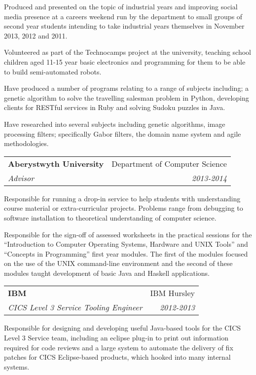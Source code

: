 \documentclass[letterpaper,11pt]{article}
\makeatletter
\newlength{\outerbordwidth}
\newcommand{\resheading}[1]{\vspace{8pt}
  \parbox{\textwidth}{\setlength{\FrameSep}{\outerbordwidth}
    \begin{shaded}
\setlength{\fboxsep}{0pt}\framebox[\textwidth][l]{\setlength{\fboxsep}{4pt}\fcolorbox{shadecolorB}{shadecolorB}{\textbf{\sffamily{\mbox{~}\makebox[6.762in][l]{\large #1} \vphantom{p\^{E}}}}}}
    \end{shaded}
  }\vspace{-5pt}
}
\newcommand{\ressubheading}[4]{
\begin{tabular*}{6.5in}{l@{\cftdotfill{\cftsecdotsep}\extracolsep{\fill}}r}
		\textbf{#1} & #2 \\
		\textit{#3} & \textit{#4} \\
\end{tabular*}\vspace{-6pt}}
\makeatother
\begin{document}
Produced and presented on the topic of industrial years and improving social
media presence at a careers weekend run by the department to small groups of
second year students intending to take industrial years themselves in November
2013, 2012 and 2011.

Volunteered as part of the Technocamps project at the university, teaching 
school children aged 11-15 year basic electronics and programming for them to 
be able to build semi-automated robots.

Have produced a number of programs relating to a range of subjects including; a
genetic algorithm to solve the travelling salesman problem in Python, 
developing clients for RESTful services in Ruby and solving Sudoku puzzles 
in Java.

Have researched into several subjects including genetic algorithms, image
processing filters; specifically Gabor filters, the domain name system and
agile methodologies.

\resheading{Work Experience}

\vspace{10pt}
\ressubheading{Aberystwyth University}{Department of Computer Science}{Advisor}
{2013-2014}
\vspace{10pt}

Responsible for running a drop-in service to help students with understanding
course material or extra-curricular projects. Problems range from debugging to
software installation to theoretical understanding of computer science.

Responsible for the sign-off of assessed worksheets in the practical sessions
for the ``Introduction to Computer Operating Systems, Hardware and UNIX Tools''
and ``Concepts in Programming'' first year modules. The first of the modules
focused on the use of the UNIX command-line environment and the second of these
modules taught development of basic Java and Haskell applications.

\vspace{10pt}
\ressubheading{IBM}{IBM Hursley}{CICS Level 3 Service Tooling Engineer}
{2012-2013}
\vspace{10pt}

Responsible for designing and developing useful Java-based tools for the CICS 
Level 3 Service team, including an eclipse plug-in to print out information 
required for code reviews and a large system to automate the delivery of fix 
patches for CICS Eclipse-based products, which hooked into many internal 
systems.
\end{document}
